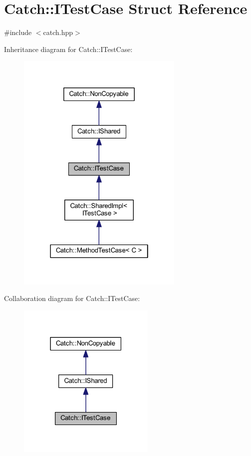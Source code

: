 \hypertarget{struct_catch_1_1_i_test_case}{}\section{Catch\+:\+:I\+Test\+Case Struct Reference}
\label{struct_catch_1_1_i_test_case}


{\ttfamily \#include $<$catch.\+hpp$>$}



Inheritance diagram for Catch\+:\+:I\+Test\+Case\+:\nopagebreak
\begin{figure}[H]
\begin{center}
\leavevmode
\includegraphics[width=226pt]{struct_catch_1_1_i_test_case__inherit__graph}
\end{center}
\end{figure}


Collaboration diagram for Catch\+:\+:I\+Test\+Case\+:\nopagebreak
\begin{figure}[H]
\begin{center}
\leavevmode
\includegraphics[width=186pt]{struct_catch_1_1_i_test_case__coll__graph}
\end{center}
\end{figure}
